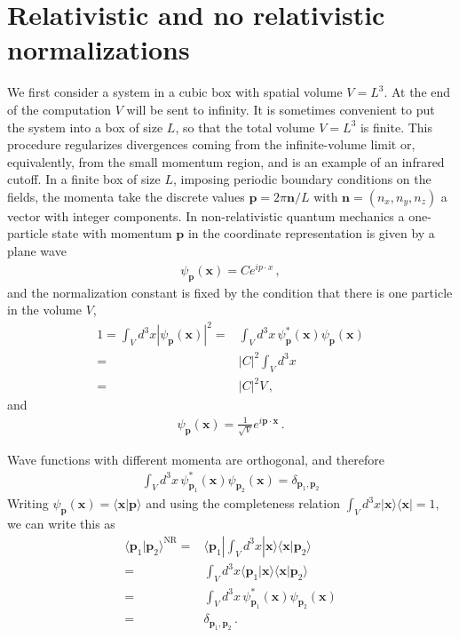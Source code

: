 \section{Relativistic and no relativistic normalizations}
\label{sec:relat-no-relat}
We first consider a system in a cubic box with spatial volume
$V=L^3$. At the end of the computation $V$ will be sent to infinity.
It is sometimes convenient to put the system into a box of size $L$,
so that the total volume $V = L^3$ is finite. This procedure
regularizes divergences coming from the infinite-volume limit or,
equivalently, from the small momentum region, and is an example of an
infrared cutoff. In a finite box of size $L$, imposing periodic
boundary conditions on the fields, the momenta take the discrete
values $\mathbf{p}=2\pi\mathbf{n}/L$ with $\mathbf{n}=(n_x,n_y,n_z)$ a
vector with integer components. In non-relativistic quantum mechanics
a one-particle state with momentum $\mathbf{p}$ in the coordinate
representation is given by a plane wave
\begin{align}
  \psi_\mathbf{p}(\mathbf{x})=C e^{ip\cdot x}\,,
\end{align}
and the normalization constant is fixed by the condition that there is
one particle in the volume $V$,
\begin{align}
1=\int_V d^3x\left|\psi_\mathbf{p}(\mathbf{x})\right|^2=&\int_V d^3x\,\psi_\mathbf{p}^*(\mathbf{x})
\psi_\mathbf{p}(\mathbf{x})\nonumber\\
=&|C|^2\int_Vd^3x\nonumber\\
=&|C|^2V\,,
\end{align}
and 
\begin{align}
  \psi_\mathbf{p}(\mathbf{x})=\frac{1}{\sqrt{V}} e^{i\mathbf{p}\cdot\mathbf{x}}\,.
\end{align}

Wave functions with different momenta are orthogonal, and therefore
\begin{align}
  \int_V d^3x\,\psi_{\mathbf{p}_1}^*(\mathbf{x})\psi_{\mathbf{p}_2}(\mathbf{x})
  =\delta_{\mathbf{p}_1,\mathbf{p}_2}
\end{align}
Writing $\psi_{\mathbf{p}}(\mathbf{x})=\langle\mathbf{x}|\mathbf{p}\rangle$ and using the completeness relation $\int_Vd^3x|\mathbf{x}\rangle\langle\mathbf{x}|=1$, we can write this as
\begin{align}
\label{eq:42}
  \langle\mathbf{p}_1|\mathbf{p}_2\rangle^{\text{NR}}=&
\langle\mathbf{p}_1|\int_Vd^3x|\mathbf{x}\rangle\langle\mathbf{x}|\mathbf{p}_2\rangle\nonumber\\
=&\int_Vd^3x\langle\mathbf{p}_1|\mathbf{x}\rangle\langle\mathbf{x}|\mathbf{p}_2\rangle\nonumber\\
=&\int_V d^3x\,\psi_{\mathbf{p}_1}^*(\mathbf{x})\psi_{\mathbf{p}_2}(\mathbf{x})\nonumber\\
  =&\delta_{\mathbf{p}_1,\mathbf{p}_2}\,.
\end{align}

